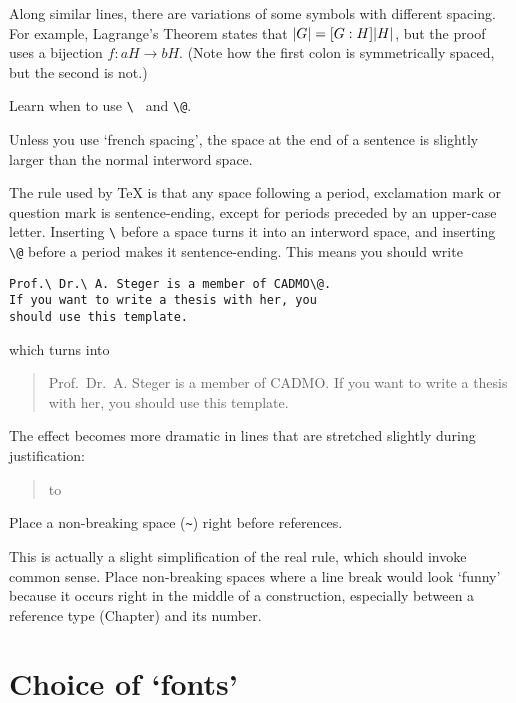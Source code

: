 Along similar lines, there are variations of some symbols with
different spacing.  For example, Lagrange's Theorem states that
\(\lvert G\rvert=[G:H]\lvert H\rvert\), but the proof uses a bijection \(f\colon
aH\to bH\).  (Note how the first colon is symmetrically spaced, but
the second is not.)

\begin{Rule}
  Learn when to use \lstinline[showspaces=true]-\ - and
  \lstinline-\@-.
\end{Rule}

Unless you use `french spacing', the space at the end of a sentence is
slightly larger than the normal interword space.

The rule used by \TeX{} is that any space following a period,
exclamation mark or question mark is sentence-ending, except for
periods preceded by an upper-case letter.  Inserting \lstinline-\-
before a space turns it into an interword space, and inserting
\lstinline-\@- before a period makes it sentence-ending.  This means
you should write
\begin{lstlisting}
Prof.\ Dr.\ A. Steger is a member of CADMO\@.
If you want to write a thesis with her, you
should use this template.
\end{lstlisting}
which turns into
\begin{quote}
  Prof.\ Dr.\ A. Steger is a member of CADMO\@.  If you want to write
  a thesis with her, you should use this template.
\end{quote}
The effect becomes more dramatic in lines that are stretched slightly
during justification:
\begin{quote}
  \parbox{\linewidth}{\hbox to \linewidth{%
      Prof.\ Dr.\ A. Steger is a member of CADMO\@.  If you}}
\end{quote}

\begin{Rule}
  Place a non-breaking space (\lstinline-~-) right before references.
\end{Rule}

This is actually a slight simplification of the real rule, which
should invoke common sense.  Place non-breaking spaces where a line
break would look `funny' because it occurs right in the middle of a
construction, especially between a reference type (Chapter) and its
number.


\section*{Choice of `fonts'}


